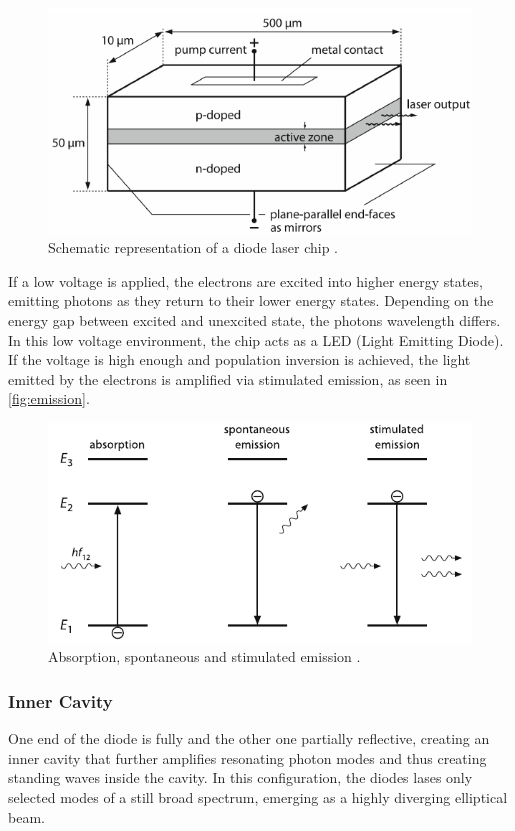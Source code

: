 \begin{figure}[H]
    \centering
    \includegraphics{figures/diode_laser_chip.pdf}
    \caption{Schematic representation of a diode laser chip \cite{laser}.}
    \label{fig:p-n_junction}
\end{figure}

If a low voltage is applied, the electrons are excited into higher energy states, emitting photons as they return to their lower energy states.
Depending on the energy gap between excited and unexcited state, the photons wavelength differs.
In this low voltage environment, the chip acts as a LED (Light Emitting Diode). \\
If the voltage is high enough and population inversion is achieved, the light emitted by the electrons is amplified via stimulated emission,
as seen in \autoref{fig:emission}.

\begin{figure}[H]
    \centering
    \includegraphics{figures/emission.pdf}
    \caption{Absorption, spontaneous and stimulated emission \cite{laser}.}
    \label{fig:emission}
\end{figure}


\subsubsection{Inner Cavity}
One end of the diode is fully and the other one partially reflective, creating an inner cavity that further amplifies resonating photon modes
and thus creating standing waves inside the cavity.
In this configuration, the diodes lases only selected modes of a still broad spectrum, emerging as a highly diverging elliptical beam.



